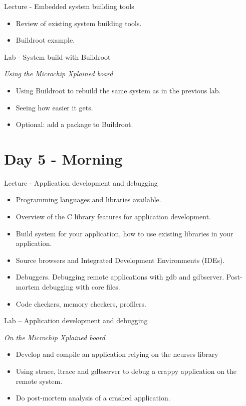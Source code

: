 \documentclass[a4paper,12pt,obeyspaces,spaces,hyphens]{article}
\begin{document}
\feagendatwocolumn
{Lecture - Embedded system building tools}
{
  \begin{itemize}
  \item Review of existing system building tools.
  \item Buildroot example.
  \end{itemize}
}
{Lab - System build with Buildroot}
{
  {\em Using the Microchip Xplained board}
  \begin{itemize}
  \item Using Buildroot to rebuild the same system as in the previous lab.
  \item Seeing how easier it gets.
  \item Optional: add a package to Buildroot.
  \end{itemize}
}

\section{Day 5 - Morning}

\feagendaonecolumn
{Lecture - Application development and debugging}
{
  \begin{itemize}
  \item Programming languages and libraries available.
  \item Overview of the C library features for application development.
  \item Build system for your application,
        how to use existing libraries in your application.
  \item Source browsers and Integrated Development Environments (IDEs).
  \item Debuggers. Debugging remote applications with gdb and gdbserver.
        Post-mortem debugging with core files.
  \item Code checkers, memory checkers, profilers.
  \end{itemize}
}

\feagendaonecolumn
{Lab – Application development and debugging}
{
  {\em On the Microchip Xplained board}
  \begin{itemize}
  \item Develop and compile an application relying on the ncurses library
  \item Using strace, ltrace and gdbserver to debug a crappy application
        on the remote system.
  \item Do post-mortem analysis of a crashed application.
  \end{itemize}
}
\end{document}
